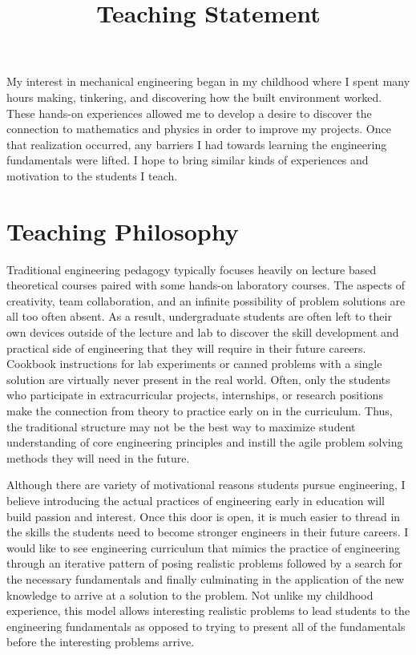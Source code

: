 \documentclass{article}
\title{Teaching Statement}
\date{}
\begin{document}
\maketitle

My interest in mechanical engineering began in my childhood where I spent many
hours making, tinkering, and discovering how the built environment worked.
These hands-on experiences allowed me to develop a desire to discover the
connection to mathematics and physics in order to improve my projects. Once
that realization occurred, any barriers I had towards learning the engineering
fundamentals were lifted. I hope to bring similar kinds of experiences and
motivation to the students I teach.

\section*{Teaching Philosophy}
%
Traditional engineering pedagogy typically focuses heavily on lecture based
theoretical courses paired with some hands-on laboratory courses. The aspects of
creativity, team collaboration, and an infinite possibility of problem
solutions are all too often absent. As a result, undergraduate students are
often left to their own devices outside of the lecture and lab to discover the
skill development and practical side of engineering that they will require in
their future careers. Cookbook instructions for lab experiments or canned
problems with a single solution are virtually never present in the real world.
Often, only the students who participate in extracurricular projects,
internships, or research positions make the connection from theory to practice
early on in the curriculum. Thus, the traditional structure may not be the best
way to maximize student understanding of core engineering principles and
instill the agile problem solving methods they will need in the future.

Although there are variety of motivational reasons students pursue engineering,
I believe introducing the actual practices of engineering early in education
will build passion and interest. Once this door is open, it is much easier to
thread in the skills the students need to become stronger engineers in their
future careers. I would like to see engineering curriculum that mimics the
practice of engineering through an iterative pattern of posing realistic
problems followed by a search for the necessary fundamentals and finally
culminating in the application of the new knowledge to arrive at a solution to
the problem. Not unlike my childhood experience, this model allows interesting
realistic problems to lead students to the engineering fundamentals as opposed
to trying to present all of the fundamentals before the interesting problems
arrive.
\end{document}
